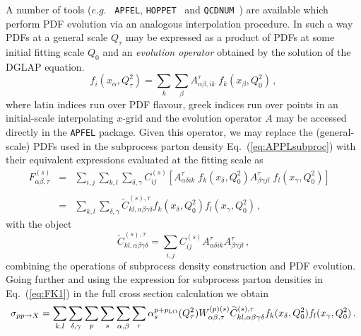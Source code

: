 \documentclass[preprint,12pt]{elsarticle}
\begin{document}
A number of tools ($e.g.$ {\tt
  APFEL},
{\tt HOPPET}~\cite{Salam:2008qg} and {\tt QCDNUM}~\cite{Botje:2010ay}) 
are available which perform PDF evolution via an analogous
interpolation procedure. In such a way PDFs at a general scale $Q_\tau$ may be
expressed as a product of PDFs at some initial fitting scale $Q_0$ and an
\textit{evolution operator} obtained by the solution of the DGLAP equation.
\begin{equation}\label{eq:fastPDFfinal_recalled}
  f_i(x_{\alpha},Q^2_\tau) = \sum_{k}
  \sum_\beta A^\tau_{\alpha\beta, ik}\;
  f_k(x_\beta,Q^2_0)\,, 
\end{equation}
where latin indices run over PDF flavour, greek indices run over points in an initial-scale interpolating $x$-grid and
the evolution operator $A$ may be accessed directly in the {\tt APFEL} package. Given this operator, we may replace the
(general-scale) PDFs used in the subprocess parton density
Eq.~(\ref{eq:APPLsubproc}) with their equivalent expressions evaluated at the fitting scale as
\begin{equation}\label{eq:FK1}
\begin{array}{rcl}
F^{(s)}_{\alpha\beta,\tau} &=&  \displaystyle \sum_{i,j} \sum_{k,l}
                               \sum_{\delta,\gamma} C^{(s)}_{ij}
                               \left[  A^\tau_{\alpha\delta ik}\;
                               f_k(x_\delta,Q^2_0) A^\tau_{\beta\gamma
                               jl}\; f_l(x_\gamma,Q^2_0) \right]\;\;\;
  \\
\\
&=& \displaystyle \sum_{k,l}\sum_{\delta,\gamma}
\widetilde{C}^{(s),\tau}_{kl,\alpha\beta\gamma\delta}
f_k(x_\delta,Q^2_0) f_l(x_\gamma,Q^2_0)\,,
\end{array}
\end{equation}
with the object
\begin{equation}
  \widetilde{C}^{(s),\tau}_{kl,\alpha\beta\gamma\delta} =
  \sum_{i,j} C^{(s)}_{ij} A^\tau_{\alpha\delta ik}
  A^\tau_{\beta\gamma jl}\,,
\end{equation}
combining the operations of subprocess density construction and PDF
evolution. Going further and using the expression for
subprocess parton densities in Eq.~(\ref{eq:FK1}) in the full
cross section calculation we obtain
\begin{equation}
\sigma_{pp\to X} = \sum_{k,l}\sum_{\delta,\gamma}\sum_p
\sum_{s} \sum_{\alpha,\beta}
\sum_{\tau} 
\alpha_s^{p+p_{\rm LO}}(Q^2_\tau)W_{\alpha\beta,\tau}^{(p)(s)} \widetilde{C}^{(s),\tau}_{kl,\alpha\beta\gamma\delta}
f_k(x_\delta,Q^2_0) f_l(x_\gamma,Q^2_0)\,.
\end{equation}
\end{document}
